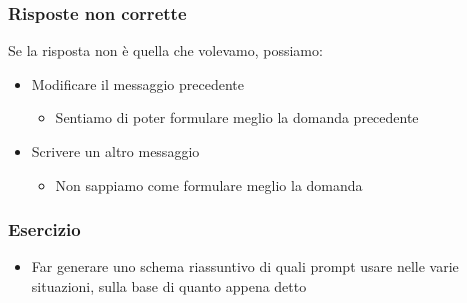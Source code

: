 \begin{contentframe}
    \frametitle{Risposte non corrette}

    Se la risposta non è quella che volevamo, possiamo:
    \bigskip
    
    \begin{itemize}
        \item Modificare il messaggio precedente
        \begin{itemize}
            \item Sentiamo di poter formulare meglio la domanda precedente
        \end{itemize}

        \bigskip
        \item Scrivere un altro messaggio
        \begin{itemize}
            \item Non sappiamo come formulare meglio la domanda
        \end{itemize}
    \end{itemize}
\end{contentframe}


\begin{exerciseframe}
    \frametitle{Esercizio}

    \begin{itemize}
        \item Far generare uno schema riassuntivo di quali prompt usare nelle varie situazioni, sulla base di quanto appena detto
    \end{itemize}
\end{exerciseframe}
